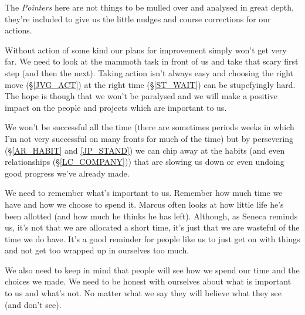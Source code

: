 \cleardoublepage
{\small

The \emph{Pointers} here are not things to be mulled over and analysed in great depth, they're included to give us the little nudges and course corrections for our actions.

Without action of some kind our plans for improvement simply won't get very far. We need to look at the mammoth task in front of us and take that scary first step (and then the next). 
Taking action isn't always easy and choosing the right move (\S \ref{JVG_ACT}) at the right time (\S \ref{ST_WAIT}) can be stupefyingly hard.
The hope is though that we won't be paralysed and we will make a positive impact on the people and projects which are important to us.

We won't be successful all the time (there are sometimes periods weeks in which I'm not very successful on many fronts for much of the time) but by persevering (\S \ref{AR_HABIT} and \ref{JP_STAND}) we can chip away at the habits (and even relationships (\S \ref{LC_COMPANY})) that are slowing us down or even undoing good progress we've already made.

We need to remember what's important to us. Remember how much time we have and how we choose to spend it. Marcus often looks at how little life he's been allotted (and how much he thinks he has left). Although, as Seneca reminds us, it's not that we are allocated a short time, it's just that we are wasteful of the time we do have. It's a good reminder for people like us to just get on with things and not get too wrapped up in ourselves too much. 

We also need to keep in mind that people will see how we spend our time and the choices we made. We need to be honest with ourselves about what is important to us and what's not. No matter what we say they will believe what they see (and don't see). 

}
